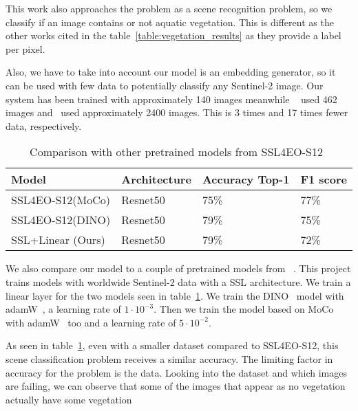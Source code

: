 \documentclass[conference]{IEEEtran}
\begin{document}
    This work also approaches the problem as a scene recognition problem, so we classify if an image contains or not aquatic vegetation.
    This is different as the other works cited in the table~\ref{table:vegetation_results} as they provide a label per pixel.

    Also, we have to take into account our model is an embedding generator, so it can be used with few data to potentially classify any Sentinel-2 image.
    Our system has been trained with approximately 140 images meanwhile ~\citet{rs12244021} used 462 images and~\citet{rs14133013} used approximately 2400 images.
    This is 3 times and 17 times fewer data, respectively.

    \begin{table}[h!]
        \centering
        \begin{tabular}{ |p{3cm}||p{1.3cm}|p{1.9cm}|p{1cm}|}
            \hline
            Model                                    & Architecture & Accuracy Top-1 & F1 score \\
            \hline
            \hline
            SSL4EO-S12(MoCo)\cite{wang2023ssl4eos12} & Resnet50     & 75\%           & 77\%     \\
            SSL4EO-S12(DINO)\cite{wang2023ssl4eos12} & Resnet50     & 79\%           & 75\%     \\
            SSL+Linear (Ours)                        & Resnet50     & 79\%           & 72\%     \\
            \hline
        \end{tabular}
        \caption{Comparison with other pretrained models from SSL4EO-S12~\cite{wang2023ssl4eos12}}
        \label{tab:vegetation_results_ssl}
    \end{table}

    We also compare our model to a couple of pretrained models from ~\citet{wang2023ssl4eos12}.
    This project trains models with worldwide Sentinel-2 data with a SSL architecture.
    We train a linear layer for the two models seen in table~\ref{tab:vegetation_results_ssl}.
    We train the DINO~\cite{DINO} model with adamW~\cite{loshchilov2019decoupled}, a learning rate of $1\cdot10^{-3}$.
    Then we train the model based on MoCo~\cite{chen2020mocov2} with adamW~\cite{loshchilov2019decoupled} too and a learning rate of $5\cdot10^{-2}$.

    As seen in table~\ref{tab:vegetation_results_ssl}, even with a smaller dataset compared to SSL4EO-S12, this scene classification problem receives a
    similar accuracy.
    The limiting factor in accuracy for the problem is the data.
    Looking into the dataset and which images are failing, we can observe that some of the images that appear as no vegetation actually have some
    vegetation
\end{document}
